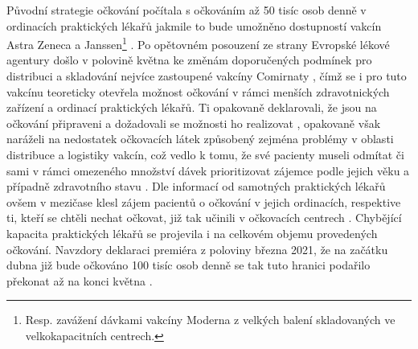 
Původní strategie očkování počítala s očkováním až 50 tisíc osob denně v ordinacích praktických lékařů jakmile to bude umožněno dostupností vakcín Astra Zeneca a Janssen\footnote{Resp. zavážení dávkami vakcíny Moderna z velkých balení skladovaných ve velkokapacitních centrech.} \cite{strategie_covid}. Po opětovném posouzení ze strany Evropské lékové agentury došlo v polovině května ke změnám doporučených podmínek pro distribuci a skladování nejvíce zastoupené vakcíny Comirnaty \cite{logoc_pfizer_mrazak}, čímž se i pro tuto vakcínu teoreticky otevřela možnost očkování v rámci menších zdravotnických zařízení a ordinací praktických lékařů. %
Ti opakovaně deklarovali, že jsou na očkování připraveni a dožadovali se možnosti ho realizovat \cite{logoc_svl,logoc_pripravenost}, opakovaně však naráželi na nedostatek očkovacích látek způsobený zejména problémy v oblasti distribuce a logistiky vakcín, což vedlo k tomu, že své pacienty museli odmítat či sami v rámci omezeného množství dávek prioritizovat zájemce podle jejich věku a případně zdravotního stavu \cite{logo_logistika}. 
%
Dle informací od samotných praktických lékařů ovšem v mezičase klesl zájem pacientů o očkování v jejich ordinacích, respektive ti, kteří se chtěli nechat očkovat, již tak učinili v očkovacích centrech \cite{logo_praktici}. 
%
Chybějící kapacita praktických lékařů se projevila i na celkovém objemu provedených očkování. Navzdory deklaraci premiéra z poloviny března 2021, že na začátku dubna již bude očkováno 100 tisíc osob denně \cite{logoc_100k} se tak tuto hranici podařilo překonat až na konci května \cite{logoc_100kmame}. %





